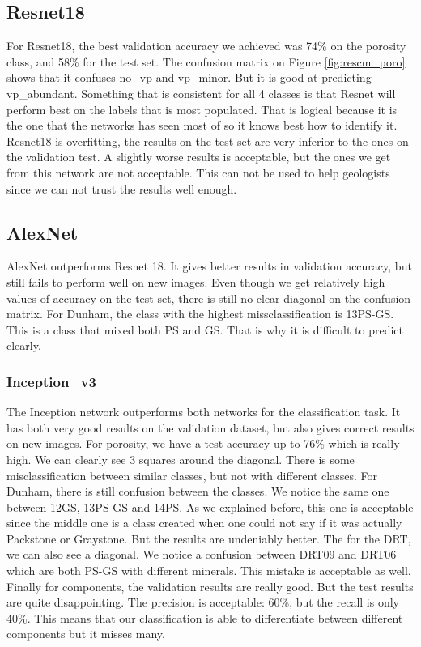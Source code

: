 \subsection{Resnet18}
For Resnet18, the best validation accuracy we achieved was 74\% on the porosity class, and 58\% for the test set. The confusion matrix on Figure \ref{fig:rescm_poro} shows that it confuses no\_vp and vp\_minor. But it is good at predicting vp\_abundant. Something that is consistent for all 4 classes is that Resnet will perform best on the labels that is most populated. That is logical because it is the one that the networks has seen most of so it knows best how to identify it. Resnet18 is overfitting, the results on the test set are very inferior to the ones on the validation test. A slightly worse results is acceptable, but the ones we get from this network are not acceptable. This can not be used to help geologists since we can not trust the results well enough.

\subsection{AlexNet}
AlexNet outperforms Resnet 18. It gives better results in validation accuracy, but still fails to perform well on new images. Even though we get relatively high values of accuracy on the test set, there is still no clear diagonal on the confusion matrix. For Dunham, the class with the highest missclassification is 13PS-GS. This is a class that mixed both PS and GS. That is why it is difficult to predict clearly. 

\subsubsection{Inception\_v3}
The Inception network outperforms both networks for the classification task. It has both very good results on the validation dataset, but also gives correct results on new images. For porosity, we have a test accuracy up to 76\% which is really high. We can clearly see 3 squares around the diagonal. There is some misclassification between similar classes, but not with different classes. 
For Dunham, there is still confusion between the classes. We notice the same one between 12GS, 13PS-GS and 14PS. As we explained before, this one is acceptable since the middle one is a class created when one could not say if it was actually Packstone or Graystone. But the results are undeniably better. 
The  for the DRT, we can also see a diagonal. We notice a confusion between DRT09 and DRT06 which are both PS-GS with different minerals. This mistake is acceptable as well.
Finally for components, the validation results are really good. But the test results are quite disappointing. The precision is acceptable: 60\%, but the recall is only 40\%. This means that our classification is able to differentiate between different components but it misses many.

